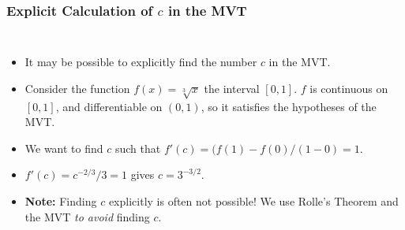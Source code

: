 \documentclass[serif,ignorenonframetext]{beamer}
\begin{document}
\begin{frame}
  \frametitle{Explicit Calculation of $c$ in the MVT}
  \begin{columns}
  \begin{itemize}[<+->]
  \item It may be possible to explicitly find the number $c$ 
    in the MVT.
  \item Consider the function $f(x)=\sqrt[3]{x}$
    the interval $[0,1]$.  $f$ is continuous on $[0,1]$, and differentiable
    on $(0,1)$, so it satisfies the hypotheses of the MVT.
  \item We want to find $c$ such that $f'(c)=(f(1)-f(0)/(1-0)=1$.
  \item $f'(c)=c^{-2/3}/3=1$ gives $c=3^{-3/2}$.
  \item \textbf{Note:} Finding $c$ explicitly is often not possible!
    We use Rolle's Theorem and the MVT \textit{to avoid} finding $c$.
  \end{itemize}

\end{columns}
\end{frame}
\end{document}
